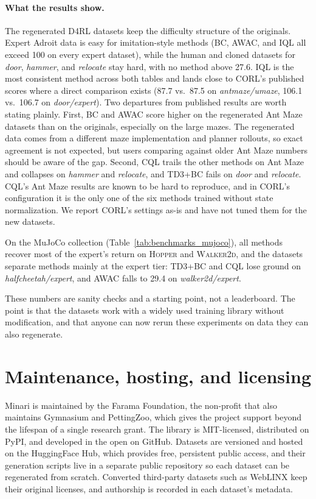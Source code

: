 \documentclass{article}
\begin{document}
\paragraph{What the results show.} The regenerated D4RL datasets keep the difficulty structure of the originals. Expert Adroit data is easy for imitation-style methods (BC, AWAC, and IQL all exceed 100 on every expert dataset), while the human and cloned datasets for \textit{door}, \textit{hammer}, and \textit{relocate} stay hard, with no method above 27.6. IQL is the most consistent method across both tables and lands close to CORL's published scores where a direct comparison exists (87.7 vs.\ 87.5 on \textit{antmaze/umaze}, 106.1 vs.\ 106.7 on \textit{door/expert}). Two departures from published results are worth stating plainly. First, BC and AWAC score higher on the regenerated Ant Maze datasets than on the originals, especially on the large mazes. The regenerated data comes from a different maze implementation and planner rollouts, so exact agreement is not expected, but users comparing against older Ant Maze numbers should be aware of the gap. Second, CQL trails the other methods on Ant Maze and collapses on \textit{hammer} and \textit{relocate}, and TD3+BC fails on \textit{door} and \textit{relocate}. CQL's Ant Maze results are known to be hard to reproduce, and in CORL's configuration it is the only one of the six methods trained without state normalization. We report CORL's settings as-is and have not tuned them for the new datasets.

On the MuJoCo collection (Table~\ref{tab:benchmarks_mujoco}), all methods recover most of the expert's return on \textsc{Hopper} and \textsc{Walker2d}, and the datasets separate methods mainly at the expert tier: TD3+BC and CQL lose ground on \textit{halfcheetah/expert}, and AWAC falls to 29.4 on \textit{walker2d/expert}.

These numbers are sanity checks and a starting point, not a leaderboard. The point is that the datasets work with a widely used training library without modification, and that anyone can now rerun these experiments on data they can also regenerate.

\section{Maintenance, hosting, and licensing}
\label{sec:maintenance}
Minari is maintained by the Farama Foundation, the non-profit that also maintains Gymnasium and PettingZoo, which gives the project support beyond the lifespan of a single research grant. The library is MIT-licensed, distributed on PyPI, and developed in the open on GitHub. Datasets are versioned and hosted on the HuggingFace Hub, which provides free, persistent public access, and their generation scripts live in a separate public repository so each dataset can be regenerated from scratch. Converted third-party datasets such as WebLINX keep their original licenses, and authorship is recorded in each dataset's metadata.
\end{document}
